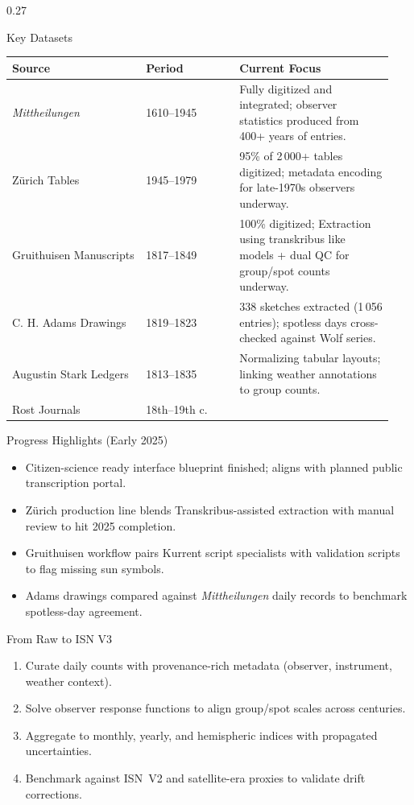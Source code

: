 \documentclass[final]{beamer}
\newenvironment{tightblock}[1]{%
  \begin{block}{#1}\vspace{0.35em}
}{\end{block}}
\begin{document}
\begin{frame}[t]
\begin{columns}[t,totalwidth=0.98\paperwidth]
\begin{column}{0.27\paperwidth}
\begin{tightblock}{Key Datasets}
\begin{tabular}{@{}p{0.33\linewidth}p{0.23\linewidth}p{0.38\linewidth}@{}}
\toprule
\textbf{Source} & \textbf{Period} & \textbf{Current Focus} \\ \midrule
\emph{Mittheilungen} & 1610--1945 & Fully digitized and integrated; observer statistics produced from 400+ years of entries. \\
Zürich Tables & 1945--1979 & 95\% of 2\,000+ tables digitized; metadata encoding for late-1970s observers underway. \\
Gruithuisen Manuscripts & 1817--1849 & 100\% digitized; Extraction using transkribus like models + dual QC for group/spot counts underway. \\
C. H. Adams Drawings & 1819--1823 & 338 sketches extracted (1\,056 entries); spotless days cross-checked against Wolf series. \\
Augustin Stark Ledgers & 1813--1835 & Normalizing tabular layouts; linking weather annotations to group counts. \\
Rost Journals & 18th--19th c. &  \\
\bottomrule
\end{tabular}
\end{tightblock}

\begin{tightblock}{Progress Highlights (Early 2025)}
\begin{itemize}
  \item Citizen-science ready interface blueprint finished; aligns with planned public transcription portal.
  \item Zürich production line blends Transkribus-assisted extraction with manual review to hit 2025 completion.
  \item Gruithuisen workflow pairs Kurrent script specialists with validation scripts to flag missing sun symbols.
  \item Adams drawings compared against \emph{Mittheilungen} daily records to benchmark spotless-day agreement.
\end{itemize}
\end{tightblock}
\begin{tightblock}{From Raw to ISN V3}
\begin{enumerate}
  \item Curate daily counts with provenance-rich metadata (observer, instrument, weather context).
  \item Solve observer response functions to align group/spot scales across centuries.
  \item Aggregate to monthly, yearly, and hemispheric indices with propagated uncertainties.
  \item Benchmark against ISN~V2 and satellite-era proxies to validate drift corrections.
\end{enumerate}
\end{tightblock}


\end{column}
\end{columns}
\end{frame}
\end{document}
